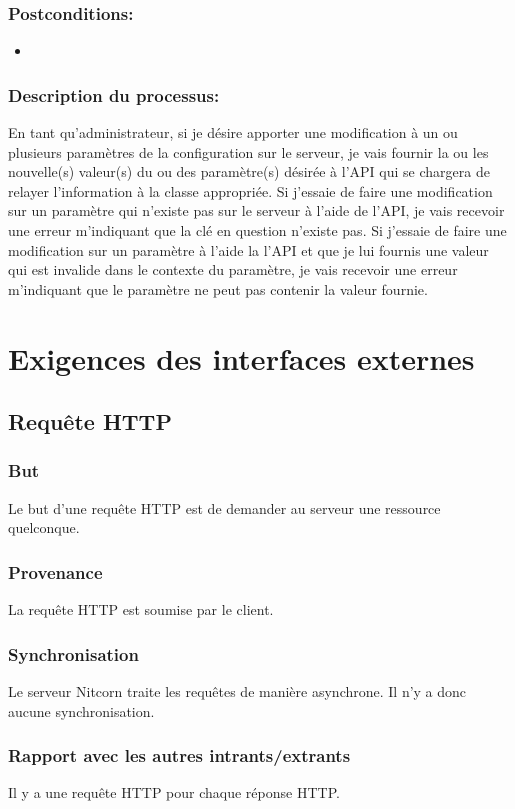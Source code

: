 \documentclass{scrreprt}
\begin{document}
\subsubsection{Postconditions:}
\begin{itemize}
    \item  
\end{itemize} 
\subsubsection{Description du processus:}En tant qu'administrateur, si je désire apporter une modification à un ou plusieurs
paramètres de la configuration sur le serveur, je vais fournir la ou les nouvelle(s) valeur(s)
du ou des paramètre(s) désirée à l'API qui se chargera de relayer l'information à la classe appropriée.
Si j'essaie de faire une modification sur un paramètre qui n'existe pas sur le
serveur à l'aide de l'API, je vais recevoir une erreur m'indiquant que la clé en
question n'existe pas.
Si j'essaie de faire une modification sur un paramètre à l'aide la l'API et que
je lui fournis une valeur qui est invalide dans le contexte du paramètre, je
vais recevoir une erreur m'indiquant que le paramètre ne peut pas contenir
la valeur fournie.

\section{Exigences des interfaces externes}
\subsection{Requête HTTP}
\subsubsection{But} Le but d'une requête HTTP est de demander au serveur une ressource quelconque.
\subsubsection{Provenance} La requête HTTP est soumise par le client.
\subsubsection{Synchronisation} Le serveur Nitcorn traite les requêtes de manière asynchrone. Il n'y a donc aucune synchronisation.
\subsubsection{Rapport avec les autres intrants/extrants} Il y a une requête HTTP pour chaque réponse HTTP.
\end{document}
